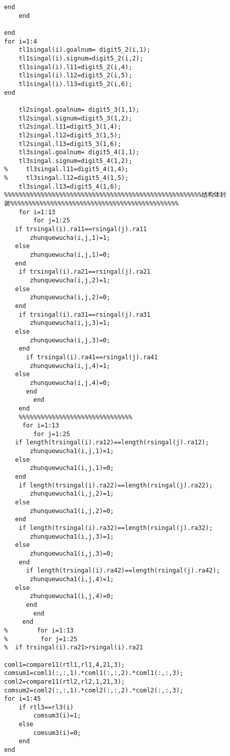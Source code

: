 \begin{appendix}
\begin{lstlisting}[caption=identification.m]
        end
    end
    
end
for i=1:4
    tl1singal(i).goalnum= digit5_2(i,1);
    tl1singal(i).signum=digit5_2(i,2);
    tl1singal(i).l11=digit5_2(i,4);
    tl1singal(i).l12=digit5_2(i,5);
    tl1singal(i).l13=digit5_2(i,6);
end

    tl2singal.goalnum= digit5_3(1,1);
    tl2singal.signum=digit5_3(1,2);
    tl2singal.l11=digit5_3(1,4);
    tl2singal.l12=digit5_3(1,5);
    tl2singal.l13=digit5_3(1,6);
    tl3singal.goalnum= digit5_4(1,1);
    tl3singal.signum=digit5_4(1,2);
%     tl3singal.l11=digit5_4(1,4);
%     tl3singal.l12=digit5_4(1,5);
    tl3singal.l13=digit5_4(1,6);
%%%%%%%%%%%%%%%%%%%%%%%%%%%%%%%%%%%%%%%%%%%%%%%%%%%%%%结构体封装%%%%%%%%%%%%%%%%%%%%%%%%%%%%%%%%%%%%%%%%%%%%%%
    for i=1:13
        for j=1:25
   if trsingal(i).ra11==rsingal(j).ra11
       zhunquewucha(i,j,1)=1;
   else
       zhunquewucha(i,j,1)=0;
   end
    if trsingal(i).ra21==rsingal(j).ra21
       zhunquewucha(i,j,2)=1;
   else
       zhunquewucha(i,j,2)=0;
   end
    if trsingal(i).ra31==rsingal(j).ra31
       zhunquewucha(i,j,3)=1;
   else
       zhunquewucha(i,j,3)=0;
    end
      if trsingal(i).ra41==rsingal(j).ra41
       zhunquewucha(i,j,4)=1;
   else
       zhunquewucha(i,j,4)=0;
      end
        end
    end
    %%%%%%%%%%%%%%%%%%%%%%%%%%%%%%%
     for i=1:13
        for j=1:25
   if length(trsingal(i).ra12)==length(rsingal(j).ra12);
       zhunquewucha1(i,j,1)=1;
   else
       zhunquewucha1(i,j,1)=0;
   end
    if length(trsingal(i).ra22)==length(rsingal(j).ra22);
       zhunquewucha1(i,j,2)=1;
   else
       zhunquewucha1(i,j,2)=0;
   end
    if length(trsingal(i).ra32)==length(rsingal(j).ra32);
       zhunquewucha1(i,j,3)=1;
   else
       zhunquewucha1(i,j,3)=0;
    end
      if length(trsingal(i).ra42)==length(rsingal(j).ra42);
       zhunquewucha1(i,j,4)=1;
   else
       zhunquewucha1(i,j,4)=0;
      end
        end
     end
%        for i=1:13
%         for j=1:25
%  if trsingal(i).ra21>rsingal(i).ra21
 
coml1=compare11(rtl1,rl1,4,21,3);
comsum1=coml1(:,:,1).*coml1(:,:,2).*coml1(:,:,3);
coml2=compare11(rtl2,rl2,1,21,3);
comsum2=coml2(:,:,1).*coml2(:,:,2).*coml2(:,:,3);
for i=1:45
    if rtl3==rl3(i)
        comsum3(i)=1;
    else
        comsum3(i)=0;
    end
end


\end{lstlisting}
\end{appendix}
